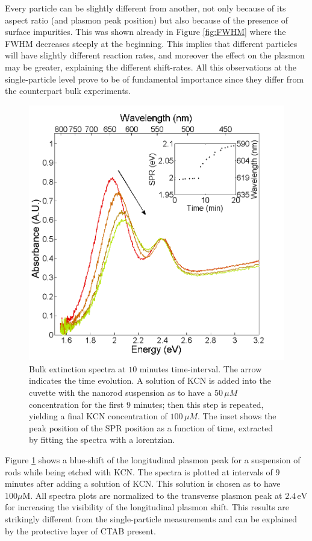 \documentclass{article}
\begin{document}
Every particle can be slightly different from another, not only because of its
aspect ratio (and plasmon peak position) but also because of the presence of
surface impurities. This was shown already in Figure \ref{fig:FWHM} where the
FWHM decreases steeply at the beginning. This implies that different particles
will have slightly different reaction rates, and moreover the effect on the
plasmon may be greater, explaining the different shift-rates. All this
observations at the single-particle level prove to be of fundamental importance 
since they differ from the counterpart bulk experiments. 

\begin{figure}[p]
 \centering 
 \includegraphics[width=0.95\linewidth]{plasmon_bulk.png}
 \caption{Bulk extinction spectra at $10$ minutes time-interval. The arrow
 indicates the time evolution. A solution of KCN is added into the cuvette with
 the nanorod suspension as to have a $50\,\mu M$ concentration for the first 9
 minutes; then this step is repeated, yielding a final KCN concentration of
 $100\, \mu M$. The inset shows the peak position of the SPR position as a
 function of time, extracted by fitting the spectra with a lorentzian.  }
 \label{fig:bulk}
\end{figure}

Figure \ref{fig:bulk} shows a blue-shift of the longitudinal plasmon peak for a
suspension of rods while being etched with KCN. The spectra is plotted at
intervals of $9$ minutes after adding a solution of KCN. This solution is chosen
as to have $100\mu\textrm{M}$. All spectra plots are normalized to the
transverse plasmon peak at $2.4\,\textrm{eV}$ for increasing the visibility of
the longitudinal plasmon shift. This results are strikingly different from the
single-particle measurements and can be explained by the protective layer of
CTAB present. 
\end{document}
